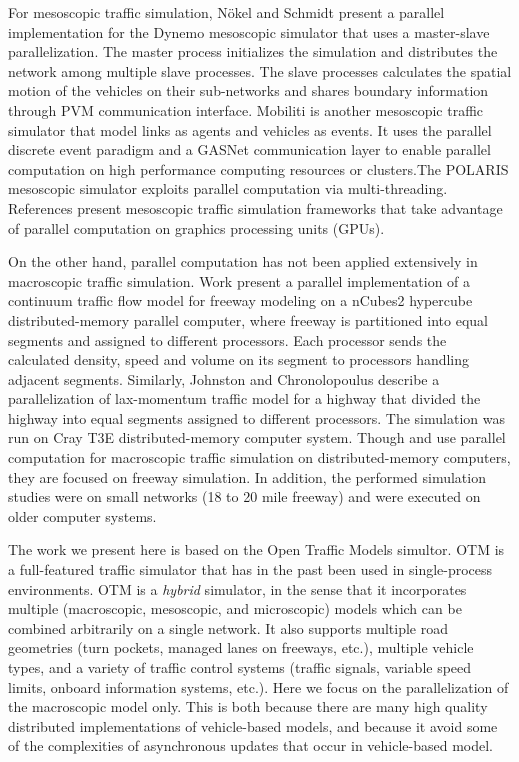  For mesoscopic traffic simulation, N{\"o}kel and Schmidt present a parallel implementation for the Dynemo mesoscopic simulator that uses a master-slave parallelization. The master process initializes the simulation and distributes the network among multiple slave processes. The slave processes calculates the spatial motion of the vehicles on their sub-networks and shares boundary information through PVM communication interface. Mobiliti \cite{chan2018mobiliti} is another mesoscopic traffic simulator that model links as agents and vehicles as events. It uses the parallel discrete event paradigm and a GASNet communication layer to enable parallel computation on high performance computing resources or clusters.The POLARIS mesoscopic simulator \cite{auld2016polaris} exploits parallel computation via multi-threading. References  \cite{xu2014mesoscopic,song2017supporting,strippgen2009multi} present mesoscopic traffic simulation frameworks that take advantage of parallel computation on graphics processing units (GPUs). 

On the other hand, parallel computation has not been applied extensively in macroscopic traffic simulation. Work \cite{chronopoulos1998real} present a parallel implementation of a continuum traffic flow model for freeway modeling on a nCubes2 hypercube distributed-memory parallel computer, where freeway is partitioned into equal segments and assigned to different processors. Each processor sends the calculated density, speed and volume on its segment to processors handling adjacent segments. Similarly, Johnston and Chronolopoulus \cite{johnston1999parallelization} describe a parallelization of lax-momentum traffic model for a highway that divided the highway into equal segments assigned to different processors. The simulation was run on Cray T3E 
distributed-memory computer system. Though \cite{chronopoulos1998real} and \cite{johnston1999parallelization} use parallel computation for macroscopic traffic simulation on distributed-memory computers, they are focused on freeway simulation. In addition, the performed simulation studies were on small networks (18 to 20 mile freeway) and were executed on older computer systems.

The work we present here is based on the Open Traffic Models simultor. OTM is a full-featured traffic simulator that has in the past been used in single-process environments. OTM is a \textit{hybrid} simulator, in the sense that it incorporates multiple (macroscopic, mesoscopic, and microscopic) models which can be combined arbitrarily on a single network. It also supports multiple road geometries (turn pockets, managed lanes on freeways, etc.), multiple vehicle types, and a variety of traffic control systems (traffic signals, variable speed limits, onboard information systems, etc.). Here we focus on the parallelization of the macroscopic model only. This is both because there are many high quality distributed implementations of vehicle-based models, and because it avoid some of the complexities of asynchronous updates that occur in vehicle-based model.
